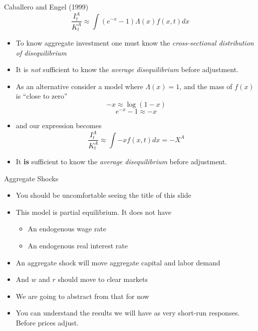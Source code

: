 \documentclass[11pt,aspectratio=169,xcolor={dvipsnames},hyperref={pdftex,pdfpagemode=UseNone,hidelinks,pdfdisplaydoctitle=true},usepdftitle=false]{beamer}
\begin{document}
\begin{frame}{Caballero and Engel (1999)}
$$\frac{I_t^A}{K^A_t} \approx \int  (e^{-x} - 1)\Lambda(x)f(x,t) dx$$
\pause
\vspace{-0.5cm}
\begin{itemize}
\item To know aggregate investment one must know the \textit{cross-sectional distribution of disequilibrium}
\pause
\item It is \textit{not} sufficient to know the \textit{average disequilibrium} before adjustment.
\pause
\item As an alternative consider a model where $\Lambda(x) = 1$, and the mass of $f(x)$ is ``close to zero''
\pause
$$-x \approx \log(1-x)$$
\vspace{-0.5cm}
$$e^{-x} - 1 \approx - x$$
\vspace{-0.5cm}
\item and our expression becomes
$$\frac{I_t^A}{K^A_t} \approx \int -x f(x,t) dx = -X^A$$
\vspace{-0.5cm}
\item It \textbf{is} sufficient to know the \textit{average disequilibrium} before adjustment. 

\end{itemize}
\end{frame}

\begin{frame}{Aggregate Shocks}
\begin{itemize}
\item You should be uncomfortable seeing the title of this slide
\pause
\item This model is partial equilibrium. It does not have
\pause
\begin{itemize}
\item An endogenous wage rate
\pause
\item An endogenous real interest rate
\pause
\end{itemize}
\item An aggregate shock will move aggregate capital and labor demand
\pause
\item And $w$ and $r$ should move to clear markets
\pause
\item We are going to abstract from that for now
\pause
\item You can understand the results we will have as very short-run responses. Before prices adjust.
\end{itemize}
\end{frame}
\end{document}
